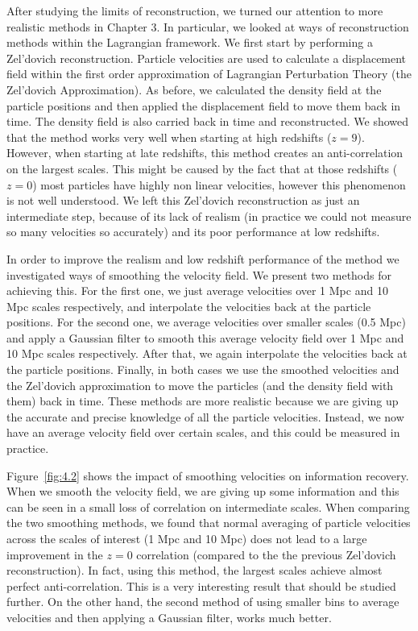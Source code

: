 After studying the limits of reconstruction, we turned our attention to more realistic methods in Chapter 3. In particular, we looked at ways of reconstruction methods within the Lagrangian framework. We first start by performing a Zel'dovich reconstruction. Particle velocities are used to calculate a displacement field within the first order approximation of Lagrangian Perturbation Theory (the Zel'dovich Approximation). As before, we calculated the density field at the particle positions and then applied the displacement field to move them back in time. The density field is also carried back in time and reconstructed. We showed that the method works very well when starting at high redshifts ($z=9$). However, when starting at late redshifts, this method creates an anti-correlation on the largest scales. This might be caused by the fact that at those redshifts ($z=0$) most particles have highly non linear velocities, however this phenomenon is not well understood. We left this Zel'dovich reconstruction as just an intermediate step, because of its lack of realism (in practice we could not measure so many velocities so accurately) and its poor performance at low redshifts.

In order to improve the realism and low redshift performance of the method we investigated ways of smoothing the velocity field. We present two methods for achieving this. For the first one, we just average velocities over 1 Mpc and 10 Mpc scales respectively, and interpolate the velocities back at the particle positions. For the second one, we average velocities over smaller scales (0.5 Mpc) and apply a Gaussian filter to smooth this average velocity field over 1 Mpc and 10 Mpc scales respectively. After that, we again interpolate the velocities back at the particle positions. Finally, in both cases we use the smoothed velocities and the Zel'dovich approximation to move the particles (and the density field with them) back in time. These methods are more realistic because we are giving up the accurate and precise knowledge of all the particle velocities. Instead, we now have an average velocity field over certain scales, and this could be measured in practice. 

Figure~\ref{fig:4.2} shows the impact of smoothing velocities on information recovery. When we smooth the velocity field, we are giving up some information and this can be seen in a small loss of correlation on intermediate scales. When comparing the two smoothing methods, we found that normal averaging of particle velocities across the scales of interest (1 Mpc and 10 Mpc) does not lead to a large improvement in the $z=0$ correlation (compared to the the previous Zel'dovich reconstruction). In fact, using this method, the largest scales achieve almost perfect anti-correlation. This is a very interesting result that should be studied further. On the other hand, the second method of using smaller bins to average velocities and then applying a Gaussian filter, works much better.  



